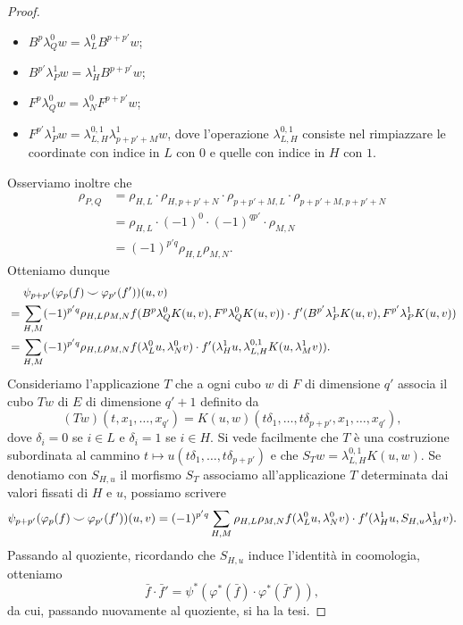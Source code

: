 \begin{proof}
\begin{itemize}
\item \(B^p\lambda^0_Qw=\lambda^0_LB^{p+p'}w\);
\item \(B^{p'}\lambda^1_Pw=\lambda^1_HB^{p+p'}w\);
\item \(F^p\lambda^0_Qw=\lambda^0_NF^{p+p'}w\);
\item \(F^{p'}\lambda^1_Pw=\lambda^{0,1}_{L,H}\lambda^1_{p+p'+M}w\), dove l'operazione \(\lambda^{0,1}_{L,H}\) consiste nel rimpiazzare le coordinate con indice in \(L\) con \(0\) e quelle con indice in \(H\) con \(1\).
\end{itemize}
Osserviamo inoltre che
\begin{align*}
\rho_{P,Q}&=\rho_{H,L}\cdot\rho_{H,p+p'+N}\cdot\rho_{p+p'+M,L}\cdot\rho_{p+p'+M,p+p'+N}\\
&=\rho_{H,L}\cdot (-1)^0\cdot(-1)^{qp'}\cdot\rho_{M,N}\\
&=(-1)^{p'q}\rho_{H,L}\rho_{M,N}.
\end{align*}
Otteniamo dunque
\begin{align*}
&\phantomop\psi_{p+p'}(\varphi_p(f)\cupp\varphi_{p'}(f'))(u,v)\\
&=\sum_{H,M}(-1)^{p'q}\rho_{H,L}\rho_{M,N} f(B^p\lambda^0_QK(u,v),F^p\lambda^0_QK(u,v))\cdot f'(B^{p'}\lambda^1_PK(u,v),F^{p'}\lambda^1_PK(u,v))\\
&=\sum_{H,M}(-1)^{p'q}\rho_{H,L}\rho_{M,N}f(\lambda^0_Lu,\lambda^0_Nv)\cdot f'(\lambda^1_Hu,\lambda^{0,1}_{L,H}K(u,\lambda^1_Mv)).
\end{align*}
Consideriamo l'applicazione \(T\) che a ogni cubo \(w\) di \(F\) di dimensione \(q'\) associa il cubo \(Tw\) di \(E\) di dimensione \(q'+1\) definito da
\[
(Tw)(t,x_1,\ldots,x_{q'})=K(u,w)(t\delta_1,\ldots,t\delta_{p+p'},x_1,\ldots,x_{q'}),
\]
dove \(\delta_i=0\) se \(i\in L\) e \(\delta_i=1\) se \(i\in H\). Si vede facilmente che \(T\) è una costruzione subordinata al cammino \(t\mapsto u(t\delta_1,\ldots,t\delta_{p+p'})\) e che \(S_Tw=\lambda^{0,1}_{L,H}K(u,w)\). Se denotiamo con \(S_{H,u}\) il morfismo \(S_T\) associamo all'applicazione \(T\) determinata dai valori fissati di \(H\) e \(u\), possiamo scrivere
\[
\psi_{p+p'}(\varphi_p(f)\mathbin{\smile}\varphi_{p'}(f'))(u,v)=(-1)^{p'q}\sum_{H,M}\rho_{H,L}\rho_{M,N}f(\lambda^0_Lu,\lambda^0_Nv)\cdot f'(\lambda^1_Hu,S_{H,u}\lambda^1_Mv).
\]
Passando al quoziente, ricordando che \(S_{H,u}\) induce l'identità in coomologia, otteniamo
\[
\bar{f}\cdot\bar{f}'=\psi^*(\varphi^*(\bar{f})\cdot\varphi^*(\bar{f}')),
\]
da cui, passando nuovamente al quoziente, si ha la tesi.
\end{proof}

